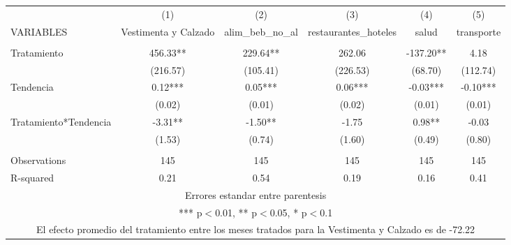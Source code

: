 \documentclass[]{article}
\begin{document}
\begin{tabular}{lccccc} \hline
 & (1) & (2) & (3) & (4) & (5) \\
VARIABLES & Vestimenta y Calzado & alim\_beb\_no\_al & restaurantes\_hoteles & salud & transporte \\ \hline
 &  &  &  &  &  \\
Tratamiento & 456.33** & 229.64** & 262.06 & -137.20** & 4.18 \\
 & (216.57) & (105.41) & (226.53) & (68.70) & (112.74) \\
Tendencia & 0.12*** & 0.05*** & 0.06*** & -0.03*** & -0.10*** \\
 & (0.02) & (0.01) & (0.02) & (0.01) & (0.01) \\
Tratamiento*Tendencia & -3.31** & -1.50** & -1.75 & 0.98** & -0.03 \\
 & (1.53) & (0.74) & (1.60) & (0.49) & (0.80) \\
 &  &  &  &  &  \\
Observations & 145 & 145 & 145 & 145 & 145 \\
 R-squared & 0.21 & 0.54 & 0.19 & 0.16 & 0.41 \\ \hline
\multicolumn{6}{c}{ Errores estandar entre parentesis} \\
\multicolumn{6}{c}{ *** p$<$0.01, ** p$<$0.05, * p$<$0.1} \\
\multicolumn{6}{c}{ El efecto promedio del tratamiento entre los meses tratados para la Vestimenta y Calzado es de -72.22} \\
\end{tabular}
\end{document}
